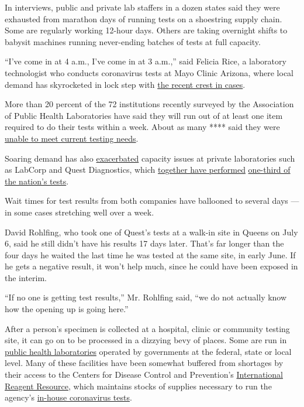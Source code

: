 In interviews, public and private lab staffers in a dozen states said
they were exhausted from marathon days of running tests on a shoestring
supply chain. Some are regularly working 12-hour days. Others are taking
overnight shifts to babysit machines running never-ending batches of
tests at full capacity.

``I've come in at 4 a.m., I've come in at 3 a.m.,'' said Felicia Rice, a
laboratory technologist who conducts coronavirus tests at Mayo Clinic
Arizona, where local demand has skyrocketed in lock step with
\href{https://www.nytimes3xbfgragh.onion/interactive/2020/us/arizona-coronavirus-cases.html}{the
recent crest in cases}.

More than 20 percent of the 72 institutions recently surveyed by the
Association of Public Health Laboratories have said they will run out of
at least one item required to do their tests within a week. About as
many **** said they were
\href{https://www.aphl.org/programs/preparedness/Crisis-Management/COVID-19-Response/Pages/COVID-19-Dashboard.aspx}{unable
to meet current testing needs}.

Soaring demand has also
\href{https://www.acla.com/covid-19/}{exacerbated} capacity issues at
private laboratories such as LabCorp and Quest Diagnostics, which
\href{https://www.labcorp.com/coronavirus-disease-covid-19/labcorp-newsroom}{together
have performed}
\href{https://newsroom.questdiagnostics.com/COVIDTestingUpdates}{one-third
of the nation's tests}.

Wait times for test results from both companies have ballooned to
several days --- in some cases stretching well over a week.

David Rohlfing, who took one of Quest's tests at a walk-in site in
Queens on July 6, said he still didn't have his results 17 days later.
That's far longer than the four days he waited the last time he was
tested at the same site, in early June. If he gets a negative result, it
won't help much, since he could have been exposed in the interim.

``If no one is getting test results,'' Mr. Rohlfing said, ``we do not
actually know how the opening up is going here.''

After a person's specimen is collected at a hospital, clinic or
community testing site, it can go on to be processed in a dizzying bevy
of places. Some are run in
\href{https://www.aphl.org/aboutAPHL/Pages/aboutphls.aspx}{public health
laboratories} operated by governments at the federal, state or local
level. Many of these facilities have been somewhat buffered from
shortages by their access to the Centers for Disease Control and
Prevention's
\href{https://www.internationalreagentresource.org/}{International
Reagent Resource}, which maintains stocks of supplies necessary to run
the agency's
\href{https://www.cdc.gov/coronavirus/2019-ncov/lab/testing.html}{in-house
coronavirus tests}.


